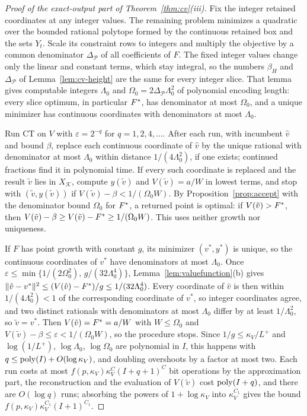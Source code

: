 \begin{proof}[Proof of the exact-output part of Theorem~\ref{thm:cv}(iii)]
Fix the integer retained coordinates at any integer values. The remaining
problem minimizes a quadratic over the bounded rational polytope formed by
the continuous retained box and the sets $Y_t$. Scale its constraint rows
to integers and multiply the objective by a common denominator
$\Delta_{\mathcal P}$ of all coefficients of $F$. The fixed integer values
change only the linear and constant terms, which stay integral, so the
numbers $\beta_H$ and $\Delta_{\mathcal P}$ of Lemma~\ref{lem:cv-height} are
the same for every integer slice. That lemma gives computable integers
$\Lambda_0$ and $\Omega_0=2\Delta_{\mathcal P}\Lambda_0^2$ of
polynomial encoding length: every slice optimum, in particular $F^{*}$, has
denominator at most $\Omega_0$, and a unique minimizer has continuous
coordinates with denominators at most $\Lambda_0$.

Run CT on $V$ with $\varepsilon=2^{-q}$ for $q=1,2,4,\ldots$. After each run,
with incumbent $\hat v$ and bound $\beta$, replace each continuous coordinate
of $\hat v$ by the unique rational with denominator at most $\Lambda_0$
within distance $1/(4\Lambda_0^2)$, if one exists; continued fractions find
it in polynomial time. If every such coordinate is replaced and the result
$\tilde v$ lies in $X_{\mathcal K}$, compute $y(\tilde v)$ and
$V(\tilde v)=a/W$ in lowest terms, and stop with $(\tilde v,y(\tilde v))$ if
$V(\tilde v)-\beta<1/(\Omega_0W)$. By Proposition~\ref{prop:accept} with the
denominator bound $\Omega_0$ for $F^{*}$, a returned point is optimal: if
$V(\tilde v)>F^{*}$, then $V(\tilde v)-\beta\ge V(\tilde v)-F^{*}\ge1/(\Omega_0W)$.
This uses neither growth nor uniqueness.

If $F$ has point growth with constant $g$, its minimizer $(v^*,y^*)$ is
unique, so the continuous coordinates of $v^*$ have denominators at most
$\Lambda_0$. Once
$\varepsilon\le\min\{1/(2\Omega_0^2),\,g/(32\Lambda_0^4)\}$,
Lemma~\ref{lem:valuefunction}(b) gives
$\lVert \hat v-v^*\rVert^2\le(V(\hat v)-F^{*})/g\le1/(32\Lambda_0^4)$. Every
coordinate of $\hat v$ is then within $1/(4\Lambda_0^2)<1$ of the
corresponding coordinate of $v^*$, so integer coordinates agree, and two
distinct rationals with denominators at most $\Lambda_0$ differ by at least
$1/\Lambda_0^2$, so $\tilde v=v^*$. Then $V(\tilde v)=F^{*}=a/W$ with
$W\le\Omega_0$ and $V(\tilde v)-\beta\le\varepsilon<1/(\Omega_0W)$, so the
procedure stops. Since $1/g\le\kappa_V/L^+$ and $\log(1/L^+)$,
$\log\Lambda_0$, $\log\Omega_0$ are polynomial in $I$, this happens with
$q\le\operatorname{poly}(I)+O(\log\kappa_V)$, and doubling overshoots by a factor at most
two. Each run costs at most $f(p,\kappa_V)\kappa_V^C(I+q+1)^C$ bit operations by
the approximation part, the reconstruction and the evaluation of
$V(\tilde v)$ cost $\operatorname{poly}(I+q)$, and there are $O(\log q)$ runs; absorbing
the powers of $1+\log\kappa_V$ into $\kappa_V^{C_1}$ gives the bound
$f(p,\kappa_V)\kappa_V^{C_1}(I+1)^{C_1}$.
\end{proof}

